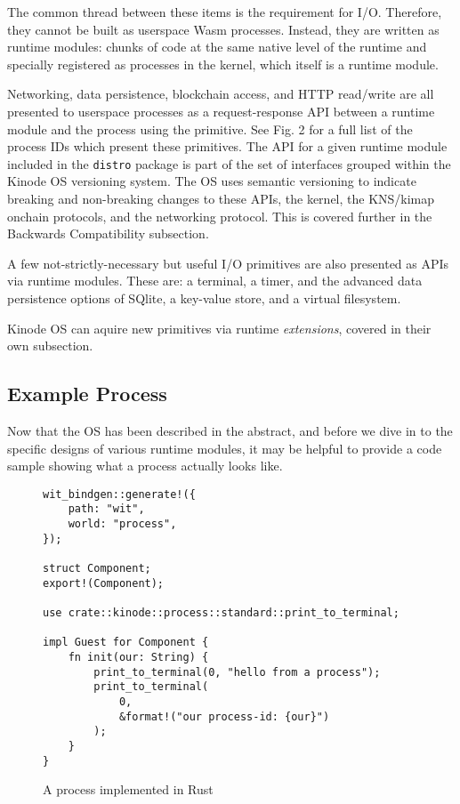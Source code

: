 \documentclass[runningheads]{llncs}
\begin{document}
The common thread between these items is the requirement for I/O.
Therefore, they cannot be built as userspace Wasm processes.
Instead, they are written as runtime modules: chunks of code at the same native level of the runtime and specially registered as processes in the kernel, which itself is a runtime module.

Networking, data persistence, blockchain access, and HTTP read/write are all presented to userspace processes as a request-response API between a runtime module and the process using the primitive.
See Fig. 2 for a full list of the process IDs which present these primitives.
The API for a given runtime module included in the \verb|distro| package is part of the set of interfaces grouped within the Kinode OS versioning system.
The OS uses semantic versioning to indicate breaking and non-breaking changes to these APIs, the kernel, the KNS/kimap onchain protocols, and the networking protocol.
This is covered further in the Backwards Compatibility subsection.

A few not-strictly-necessary but useful I/O primitives are also presented as APIs via runtime modules.
These are: a terminal, a timer, and the advanced data persistence options of SQlite, a key-value store, and a virtual filesystem.

Kinode OS can aquire new primitives via runtime \textit{extensions}, covered in their own subsection.

\subsection{Example Process}

Now that the OS has been described in the abstract, and before we dive in to the specific designs of various runtime modules, it may be helpful to provide a code sample showing what a process actually looks like.

\begin{figure}[H]
\begin{lstlisting}
wit_bindgen::generate!({
    path: "wit",
    world: "process",
});

struct Component;
export!(Component);

use crate::kinode::process::standard::print_to_terminal;

impl Guest for Component {
    fn init(our: String) {
        print_to_terminal(0, "hello from a process");
        print_to_terminal(
            0,
            &format!("our process-id: {our}")
        );
    }
}
\end{lstlisting}
    \caption{A process implemented in Rust}
    \label{fig:example process}
\end{figure}
\end{document}
